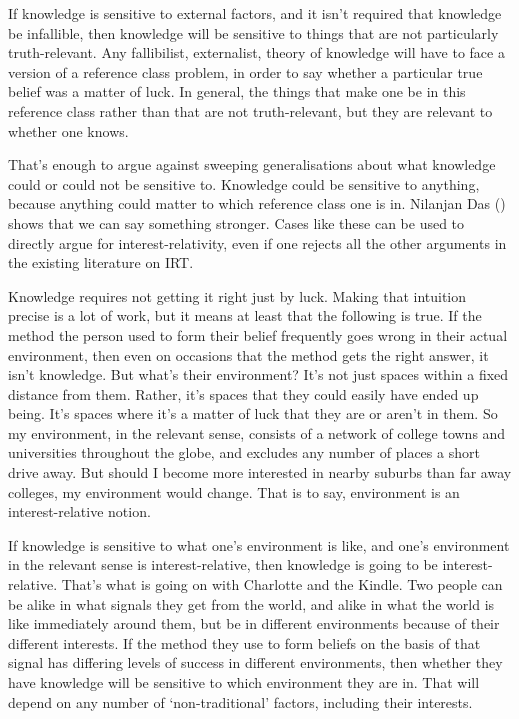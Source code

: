 \documentclass[
  10pt,
  letterpaper,
  twoside]{scrbook}
\begin{document}
If knowledge is sensitive to external factors, and it isn't required
that knowledge be infallible, then knowledge will be sensitive to things
that are not particularly truth-relevant. Any fallibilist, externalist,
theory of knowledge will have to face a version of a reference class
problem, in order to say whether a particular true belief was a matter
of luck. In general, the things that make one be in this reference class
rather than that are not truth-relevant, but they are relevant to
whether one knows.

That's enough to argue against sweeping generalisations about what
knowledge could or could not be sensitive to. Knowledge could be
sensitive to anything, because anything could matter to which reference
class one is in. Nilanjan Das ()
shows that we can say something stronger. Cases like these can be used
to directly argue for interest-relativity, even if one rejects all the
other arguments in the existing literature on IRT.

Knowledge requires not getting it right just by luck. Making that
intuition precise is a lot of work, but it means at least that the
following is true. If the method the person used to form their belief
frequently goes wrong in their actual environment, then even on
occasions that the method gets the right answer, it isn't knowledge. But
what's their environment? It's not just spaces within a fixed distance
from them. Rather, it's spaces that they could easily have ended up
being. It's spaces where it's a matter of luck that they are or aren't
in them. So my environment, in the relevant sense, consists of a network
of college towns and universities throughout the globe, and excludes any
number of places a short drive away. But should I become more interested
in nearby suburbs than far away colleges, my environment would change.
That is to say, environment is an interest-relative notion.

If knowledge is sensitive to what one's environment is like, and one's
environment in the relevant sense is interest-relative, then knowledge
is going to be interest-relative. That's what is going on with Charlotte
and the Kindle. Two people can be alike in what signals they get from
the world, and alike in what the world is like immediately around them,
but be in different environments because of their different interests.
If the method they use to form beliefs on the basis of that signal has
differing levels of success in different environments, then whether they
have knowledge will be sensitive to which environment they are in. That
will depend on any number of `non-traditional' factors, including their
interests.
\end{document}
